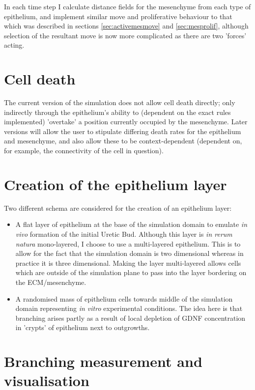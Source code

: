 \documentclass[pdftex,10pt,a4paper]{article}
\begin{document}
In each time step I calculate distance fields for the mesenchyme from each type of epithelium, and implement similar move and proliferative behaviour to that which was described in sections \ref{sec:activemesmove} and \ref{sec:mesprolif}, although selection of the resultant move is now more complicated as there are two 'forces' acting.

\section{Cell death}
The current version of the simulation does not allow cell death directly; only indirectly through the epithelium's ability to (dependent on the exact rules implemented) 'overtake' a position currently occupied by the mesenchyme. Later versions will allow the user to stipulate differing death rates for the epithelium and mesenchyme, and also allow these to be context-dependent (dependent on, for example, the connectivity of the cell in question).

\section{Creation of the epithelium layer}
Two different schema are considered for the creation of an epithelium layer:
\begin{itemize}
\item A flat layer of epithelium at the base of the simulation domain to emulate \textit{in vivo} formation of the initial Uretic Bud. Although this layer is \textit{in rerum natura} mono-layered, I choose to use a multi-layered epithelium. This is to allow for the fact that the simulation domain is two dimensional whereas in practice it is three dimensional. Making the layer multi-layered allows cells which are outside of the simulation plane to pass into the layer bordering on the ECM/mesenchyme.
\item A randomised mass of epithelium cells towards middle of the simulation domain representing \textit{in vitro} experimental conditions. The idea here is that branching arises partly as a result of local depletion of GDNF concentration in 'crypts' of epithelium next to outgrowths.
\end{itemize}

\section{Branching measurement and visualisation}
\end{document}
